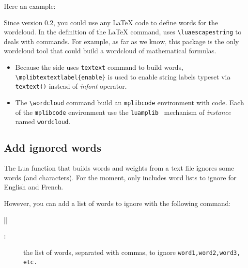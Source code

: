 \documentclass[english]{ltxdoc}
\begin{document}
Here an example:
\begin{ExempleLaTeX} 
\end{ExempleLaTeX}

Since version 0.2, you could use any \LaTeX{} code to define words for the
wordcloud. In the definition of the \LaTeX{} command, \wordcloudpkg{} uses
\lstinline+\luaescapestring+ to deals with commands. For example, as far as we
know,  this \wordcloudpkg package is the only wordcloud tool that could build a
wordcloud of mathematical formulas. 

\begin{remark}
  \begin{itemize}
    \item   Because the  side uses \lstinline+textext+ command to build
  words, \lstinline+\mplibtextextlabel{enable}+ is used to enable string labels
  typeset via \lstinline+textext()+ instead of \emph{infont} operator.
\item The \lstinline+\wordcloud+ command build an \lstinline+mplibcode+
environment with  code. Each of the \lstinline+mplibcode+
environment use the \lstinline+luamplib+~\cite{ctan-luamplib} mechanism of
\emph{instance} named \lstinline+wordcloud+. 
  \end{itemize}
\end{remark}

\subsection{Add ignored words}

The Lua function that builds words and weights from a text file ignores some
words (and characters). For the moment,  only includes word
lists to ignore for English and French.

However, you can add a list of words to ignore with the following command:

\commande||\smallskip\index{\wordcloudIgnoreWords@\lstinline+\wordcloudIgnoreWords+}

\begin{description}
  \item[:] the list of words, separated with commas, to ignore
  \lstinline+word1,word2,word3, etc.+
\end{description}
\end{document}
